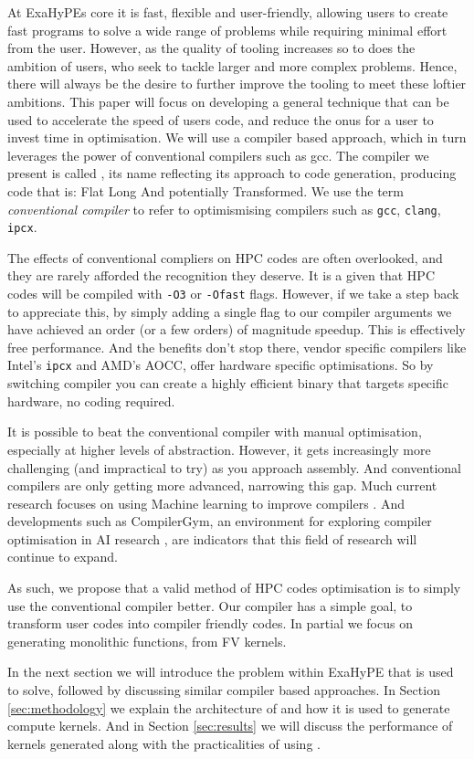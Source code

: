At ExaHyPEs core it is fast, flexible and user-friendly, allowing users to create fast programs to solve a wide range of problems while requiring minimal effort from the user.
However, as the quality of tooling increases so to does the ambition of users, who seek to tackle larger and more complex problems.
Hence, there will always be the desire to further improve the tooling to meet these loftier ambitions.
This paper will focus on developing a general technique that can be used to accelerate the speed of users code, and reduce the onus for a user to invest time in optimisation.
We will use a compiler based approach, which in turn leverages the power of conventional compilers such as gcc.
The compiler we present is called \phlat, its name reflecting its approach to code generation, producing code that is: Flat Long And potentially Transformed. 
We use the term \textit{conventional compiler} to refer to optimismising compilers such as \texttt{gcc}, \texttt{clang}, \texttt{ipcx}.  


The effects of conventional compliers on HPC codes are often overlooked, and they are rarely afforded the recognition they deserve.
It is a given that HPC codes will be compiled with \texttt{-O3} or \texttt{-Ofast} flags.
However, if we take a step back to appreciate this, by simply adding a single flag to our compiler arguments we have achieved an order (or a few orders) of magnitude speedup.
This is effectively free performance.
And the benefits don't stop there, vendor specific compilers like Intel's \texttt{ipcx} and AMD's AOCC, offer hardware specific optimisations.
So by switching compiler you can create a highly efficient binary that targets specific hardware, no coding required.

It is possible to beat the conventional compiler with manual optimisation, especially at higher levels of abstraction.
However, it gets increasingly more challenging (and impractical to try) as you approach assembly.
And conventional compilers are only getting more advanced, narrowing this gap.   
Much current research focuses on using Machine learning to improve compilers \cite{compiler-ml-opt,lots-of-compiler-options}.
And developments such as CompilerGym, an environment for exploring compiler optimisation in AI research \cite{compiler-gym}, are indicators that this field of research will continue to expand. 

As such, we propose that a valid method of HPC codes optimisation is to simply use the conventional compiler better.
Our \phlat compiler has a simple goal, to transform user codes into compiler friendly codes.    
In partial we focus on generating monolithic functions, from FV kernels.

In the next section we will introduce the problem within ExaHyPE that \phlat is used to solve, followed by discussing similar compiler based approaches.
In Section \ref{sec:methodology} we explain the architecture of \phlat and how it is used to generate compute kernels.
And in Section \ref{sec:results} we will discuss the performance of kernels generated along with the practicalities of using \phlat. 